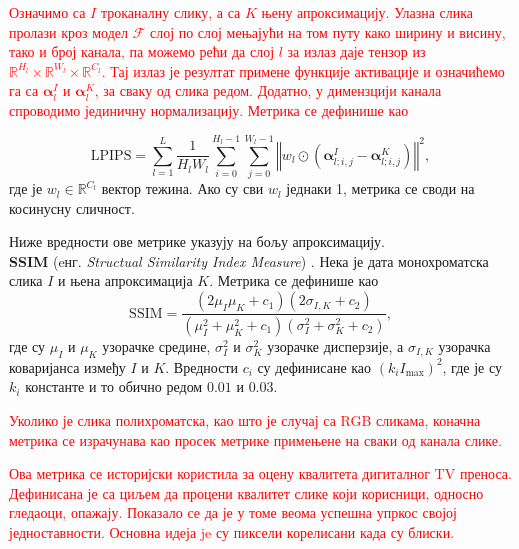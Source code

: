 \documentclass[12pt, a4paper, twoside]{book}
\numberwithin{equation}{chapter}
\numberwithin{theorem}{section}
\numberwithin{definition}{section}
\numberwithin{definitionChapter}{chapter}
\begin{document}
\textcolor{red}{
Означимо са $I$ троканалну слику, а са $K$ њену апроксимацију. Улазна слика пролази кроз модел $\mathcal{F}$ слој по слој
мењајући на том путу како ширину и висину, тако и број канала, па можемо рећи да слој $l$ за излаз даје тензор из
$\mathbb{R}^{H_l}\times\mathbb{R}^{W_l}\times\mathbb{R}^{C_l}$. Тај излаз је резултат примене функције активације
и означићемо га са $\boldsymbol{\alpha}_{l}^{I}$ и $\boldsymbol{\alpha}_{l}^{K}$, за сваку од слика редом. Додатно,
у димензцији канала спроводимо јединичну нормализацију. Метрика се дефинише као}

\begin{equation}
	\text{LPIPS} = \sum_{l=1}^{L}\frac{1}{H_l W_l}\sum_{i=0}^{H_l - 1}\sum_{j=0}^{W_l - 1}
	\left\Vert w_l \odot (\boldsymbol{\alpha}_{l; i, j}^{I} - \boldsymbol{\alpha}_{l; i, j}^{K}) \right\Vert^2,
\end{equation}
где је $w_l \in \mathbb{R}^{C_l}$ вектор тежина. Ако су сви $w_l$ једнаки 1, метрика се своди на косинусну сличност.

Ниже вредности ове метрике указују на бољу апроксимацију. \\

\noindent \textbf{SSIM} (eнг. \textit{Structual Similarity Index Measure}) \cite{ssim}.  Нека је дата монохроматска
слика $I$ и њена апроксимација $K$. Метрика се дефинише као
\begin{equation}
	\text{SSIM} = \frac{(2\mu_{I}\mu_{K} + c_1)(2\sigma_{I, K} + c_2)}{(\mu_{I}^2 + \mu_{K}^2 + c_1)(\sigma_{I}^2 + \sigma_{K}^2 + c_2)},
\end{equation}
где су $\mu_{I}$ и $\mu_{K}$ узорачке средине, $\sigma_{I}^2$ и $\sigma_{K}^2$ узорачке дисперзије, а $\sigma_{I, K}$
узорачка коваријанса између $I$ и $K$. Вредности $c_i$ су дефинисане као $(k_i I_{\max})^2$, где је су $k_i$ константе
и то обично редом $0.01$ и $0.03$.

\textcolor{red}{Уколико је слика полихроматска, као што је случај са RGB сликама, коначна метрика се израчунава као просек метрике
примењене на сваки од канала слике.}

\textcolor{red}{Ова метрика се историјски користила за оцену квалитета дигиталног TV преноса. Дефинисана је са циљем да процени квалитет
слике који корисници, односно гледаоци, опажају. Показало се да је у томе веома успешна упркос својој једноставности. Основна идеја je су пиксели
корелисани када су блиски.}

\end{document}
